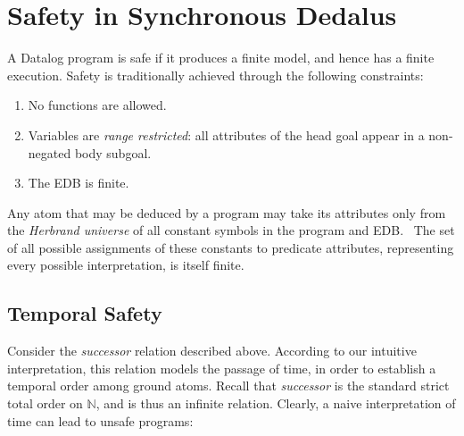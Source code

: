 \section{Safety in Synchronous Dedalus}

A Datalog program is safe if it produces a finite model, and hence has a finite
execution.  Safety is traditionally achieved through the following constraints:

\begin{enumerate}
%
\item No functions are allowed. 
%
\item Variables are \emph{range restricted}: all attributes of the head goal
appear in a non-negated body subgoal.
%
\item The EDB is finite.
%
\end{enumerate}

Any atom that may be deduced by a program may take its attributes only from the \emph{Herbrand universe} of
all constant symbols in the program and EDB.~
The set of all possible assignments of these constants to predicate attributes,
representing every possible interpretation, is itself finite. 


\subsection{Temporal Safety}

Consider the \emph{successor} relation described above.  According to our intuitive interpretation, this relation models
the passage of time, in order to establish a temporal order among ground atoms.  
Recall that {\em successor} is the standard strict total order on $\mathbb{N}$,
and is thus an infinite relation.  Clearly, a naive interpretation of time can
lead to unsafe programs:




